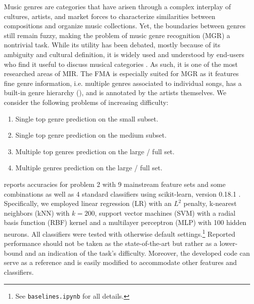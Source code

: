 \documentclass{article}
\begin{document}
Music genres are categories that have arisen through a complex interplay of cultures, artists, and market forces to characterize similarities between compositions and organize music collections. Yet, the boundaries between genres still remain fuzzy, making the problem of music genre recognition (MGR) a nontrivial task.
While its utility has been debated, mostly because of its ambiguity and cultural definition, it is widely used and understood by end-users who find it useful to discuss musical categories \cite{mgr_why}.
As such, it is one of the most researched areas of MIR.
The FMA is especially suited for MGR as it features fine genre information, i.e. multiple genres associated to individual songs, has a built-in genre hierarchy (), and is annotated by the artists themselves.
We consider the following problems of increasing difficulty:
\begin{enumerate}
	\item Single top genre prediction on the small subset.
	\item Single top genre prediction on the medium subset.
	\item Multiple top genres prediction on the large / full set.
	\item Multiple genres prediction on the large / full set.
\end{enumerate}


 reports accuracies for problem 2 with 9 mainstream feature sets and some combinations as well as 4 standard classifiers using scikit-learn, version 0.18.1 \cite{scikit-learn}. Specifically, we employed linear regression (LR) with an $L^2$ penalty, k-nearest neighbors (kNN) with $k=200$, support vector machines (SVM) with a radial basis function (RBF) kernel and a multilayer perceptron (MLP) with 100 hidden neurons. All classifiers were tested with otherwise default settings.\footnote{See \texttt{baselines.ipynb} for all details.} Reported performance should not be taken as the state-of-the-art but rather as a lower-bound and an indication of the task's difficulty. Moreover, the developed code can serve as a reference and is easily modified to accommodate other features and classifiers.
\end{document}
